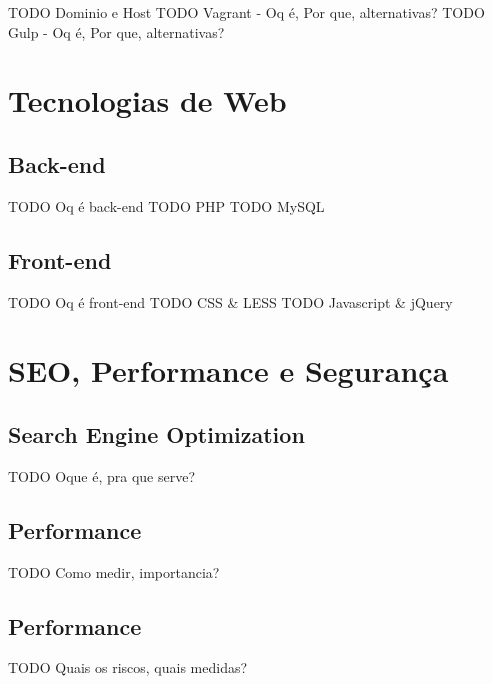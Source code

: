 TODO Dominio e Host
TODO Vagrant - Oq é, Por que, alternativas?
TODO Gulp - Oq é, Por que, alternativas?

\section{Tecnologias de Web}

\subsection{Back-end}

TODO Oq é back-end
TODO PHP
TODO MySQL

\subsection{Front-end}

TODO Oq é front-end
TODO CSS & LESS
TODO Javascript & jQuery

\section{SEO, Performance e Segurança}

\subsection{Search Engine Optimization}

TODO Oque é, pra que serve?

\subsection{Performance}

TODO Como medir, importancia?

\subsection{Performance}

TODO Quais os riscos, quais medidas?
